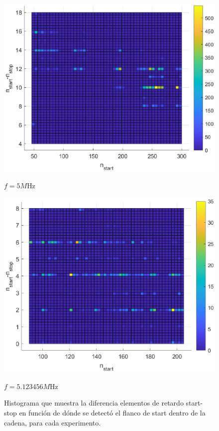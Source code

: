 \begin{figure}[H]
     \vspace{0.5cm} %
     
     \begin{minipage}{0.45\textwidth}
         \centering
         \includegraphics[width=\textwidth]{imagenes/start-stop_5M.eps} %
         \caption{$f = 5M$Hz}
     \end{minipage}\hfill
     \begin{minipage}{0.45\textwidth}
         \centering
         \includegraphics[width=\textwidth]{imagenes/start-stop_magic.eps} %
         \caption{$f = 5.123456M$Hz}
     \end{minipage}
     \caption{Histograma que muestra la diferencia elementos de retardo start-stop en función
          de dónde se detectó el flanco de start dentro de la cadena, para cada experimento.}
 \end{figure}
 


